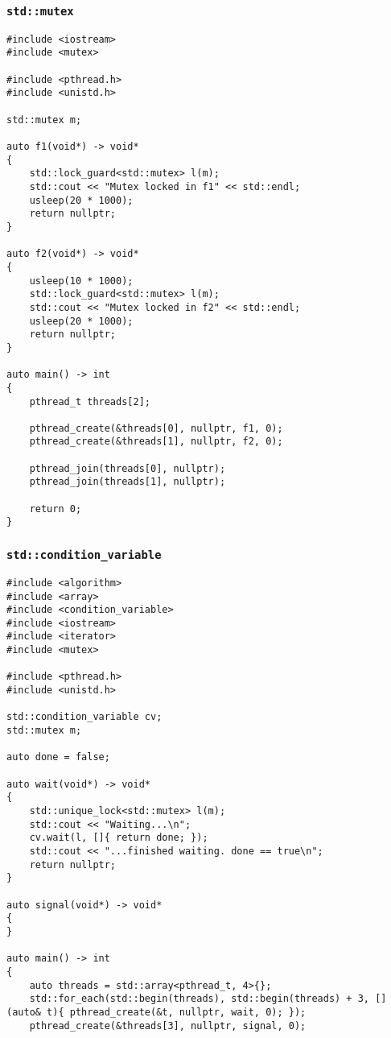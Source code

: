 \begin{appendix}
\subsubsection{\texttt{std::mutex}}\label{app:scorep_sync_mutex}

\begin{verbatim}
#include <iostream>
#include <mutex>

#include <pthread.h>
#include <unistd.h>

std::mutex m;

auto f1(void*) -> void*
{
    std::lock_guard<std::mutex> l(m);
    std::cout << "Mutex locked in f1" << std::endl;
    usleep(20 * 1000);
    return nullptr;
}

auto f2(void*) -> void*
{
    usleep(10 * 1000);
    std::lock_guard<std::mutex> l(m);
    std::cout << "Mutex locked in f2" << std::endl;
    usleep(20 * 1000);
    return nullptr;
}

auto main() -> int
{
    pthread_t threads[2];
    
    pthread_create(&threads[0], nullptr, f1, 0);
    pthread_create(&threads[1], nullptr, f2, 0);
    
    pthread_join(threads[0], nullptr);
    pthread_join(threads[1], nullptr);
    
    return 0;
}
\end{verbatim}

\subsubsection{\texttt{std::condition\_variable}}\label{app:scorep_sync_cv}

\begin{verbatim}
#include <algorithm>
#include <array>
#include <condition_variable>
#include <iostream>
#include <iterator>
#include <mutex>

#include <pthread.h>
#include <unistd.h>

std::condition_variable cv;
std::mutex m;

auto done = false;

auto wait(void*) -> void*
{
    std::unique_lock<std::mutex> l(m);
    std::cout << "Waiting...\n";
    cv.wait(l, []{ return done; });
    std::cout << "...finished waiting. done == true\n";
    return nullptr;
}

auto signal(void*) -> void*
{
}

auto main() -> int
{
    auto threads = std::array<pthread_t, 4>{};
    std::for_each(std::begin(threads), std::begin(threads) + 3, [](auto& t){ pthread_create(&t, nullptr, wait, 0); });
    pthread_create(&threads[3], nullptr, signal, 0);
    

\end{verbatim}
\end{appendix}
